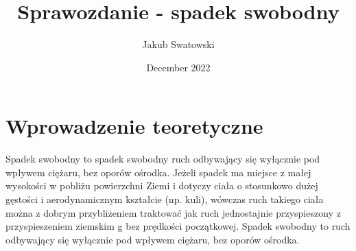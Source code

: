 \documentclass{article}
\title{Sprawozdanie - spadek swobodny}
\author{Jakub Swatowski}
\date{December 2022}
\begin{document}
\maketitle

\section{Wprowadzenie teoretyczne}
Spadek swobodny to spadek swobodny ruch odbywający się wyłącznie pod wpływem ciężaru, bez oporów ośrodka. Jeżeli spadek ma miejsce z małej wysokości w pobliżu powierzchni Ziemi i dotyczy ciała o stosunkowo dużej gęstości i aerodynamicznym kształcie (np. kuli), wówczas ruch takiego ciała można z dobrym przybliżeniem traktować jak ruch jednostajnie przyspieszony z przyspieszeniem ziemskim g bez prędkości początkowej. Spadek swobodny to ruch odbywający się wyłącznie pod wpływem ciężaru, bez oporów ośrodka.
\end{document}

